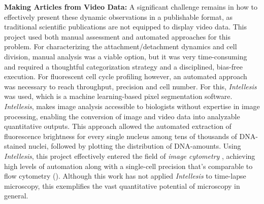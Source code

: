 
\textbf{Making Articles from Video Data:} A significant challenge remains in how
to effectively present these dynamic observations in a publishable format, as
traditional scientific publications are not equipped to display video data. This
project used both manual assessment and automated approaches for this problem.
For characterizing the attachment/detachment dynamics and cell division, manual
analysis was a viable option, but it was very time-consuming and required a
thoughtful categorization strategy and a disciplined, bias-free execution. For
fluorescent cell cycle profiling however, an automated approach was necessary to
reach throughput, precision and cell number. For this, \textit{Intellesis} was
used, which is a machine learning-based pixel segmentation software.
\textit{Intellesis}, makes image analysis accessible to biologists without
expertise in image processing, enabling the conversion of image and video data
into analyzable quantitative outputs. This approach allowed the automated
extraction of fluorescence brightness for every single nucleus among tens of
thousands of DNA-stained nuclei, followed by plotting the distribution of
DNA-amounts. Using \textit{Intellesis}, this project effectively entered the
field of \emph{image cytometry} \cite{guptaDeepLearningImage2019}, achieving
high levels of automation along with a single-cell precision that's comparable
to flow cytometry (). Although this work has not
applied \textit{Intellesis} to time-lapse microscopy, this exemplifies the vast
quantitative potential of microscopy 
in general.





